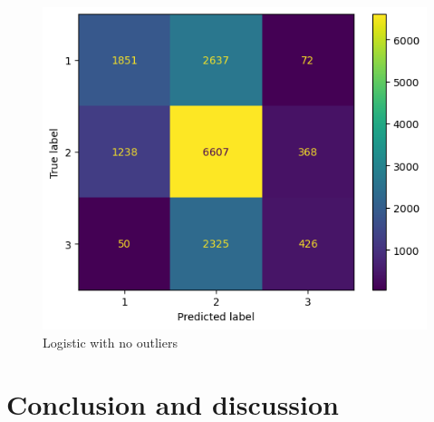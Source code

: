 \documentclass[twocolumn]{article}
\begin{document}
\begin{figure}
    \centering
    \includegraphics[width=0.65\columnwidth]{logisticNoOutliers.png}
    \caption{Logistic with no outliers}
\end{figure}

\clearpage
\section*{Conclusion and discussion}
\end{document}
